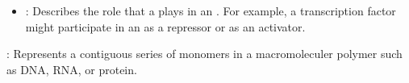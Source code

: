 \begin{description}
\begin{itemize}
\item \emph{}:
Describes the role that a  plays in an .
For example, a transcription factor might participate in an  as a repressor or as an activator.

\end{itemize}

\item \emph{}:
Represents a contiguous series of monomers in a macromoleculer polymer such as DNA, RNA, or protein. 

\end{description}